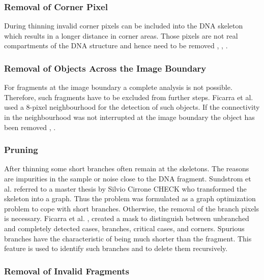 \documentclass{article}
\begin{document}
\subsubsection{Removal of Corner Pixel}

During thinning invalid corner pixels can be included into the DNA skeleton which results in a longer distance in corner areas. Those pixels are not real compartments of the DNA structure and hence need to be removed  \cite{sanchez2002accuracy},  \cite{ficarra2002automated},  \cite{spisz1998automated}.

\subsubsection{Removal of Objects Across the Image Boundary}

For fragments at the image boundary a complete analysis is not possible. Therefore, such fragments have to be excluded from further steps. Ficarra et al. used a 8-pixel neighbourhood for the detection of such objects. If the connectivity in the neighbourhood was not interrupted at the image boundary the object has been removed  \cite{ficarra2005automated},  \cite{ficarra2005automatic}. 

\subsubsection{Pruning}

After thinning some short branches often remain at the skeletons. The reasons are impurities in the sample or noise close to the DNA fragment. Sundstrom et al. \cite{sundstrom2012image} referred to a master thesis by Silvio Cirrone CHECK who transformed the skeleton into a graph. Thus the problem was formulated as a graph optimization problem to cope with short branches. Otherwise, the removal of the branch pixels is necessary. Ficarra et al. \cite{ficarra2002automated},  \cite{ficarra2005automated} created a mask to distinguish between unbranched and completely detected cases, branches, critical cases, and corners. Spurious branches have the characteristic of being much shorter than the fragment. This feature is used to identify such branches and to delete them recursively.  



\subsubsection{Removal of Invalid Fragments}
\end{document}
